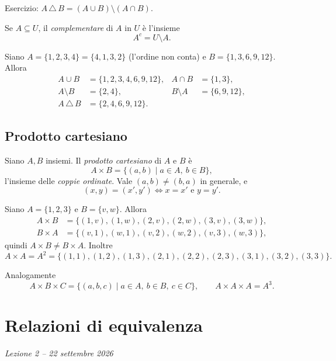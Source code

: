 \documentclass[11pt,a4paper]{article}
\begin{document}
Esercizio: $A \,\triangle\, B = (A \cup B) \setminus (A \cap B)$.

\begin{definizione}
Se $A \subseteq U$, il \emph{complementare} di $A$ in $U$ è l'insieme
\[
A^c = U \setminus A.
\]
\end{definizione}

\begin{esempio}
Siano $A = \{1, 2, 3, 4\} = \{4, 1, 3, 2\}$ (l'ordine non conta) e
$B = \{1, 3, 6, 9, 12\}$. Allora
\begin{align*}
A \cup B &= \{1, 2, 3, 4, 6, 9, 12\}, & A \cap B &= \{1, 3\}, \\
A \setminus B &= \{2, 4\}, & B \setminus A &= \{6, 9, 12\}, \\
A \,\triangle\, B &= \{2, 4, 6, 9, 12\}.
\end{align*}
\end{esempio}

\subsection{Prodotto cartesiano}

\begin{definizione}
Siano $A, B$ insiemi. Il \emph{prodotto cartesiano} di $A$ e $B$ è
\[
A \times B = \{(a, b) \mid a \in A,\ b \in B\},
\]
l'insieme delle \emph{coppie ordinate}. Vale $(a, b) \neq (b, a)$ in
generale, e
\[
(x, y) = (x', y') \iff x = x' \text{ e } y = y'.
\]
\end{definizione}

\begin{esempio}
Siano $A = \{1, 2, 3\}$ e $B = \{v, w\}$. Allora
\begin{align*}
A \times B &= \{(1,v), (1,w), (2,v), (2,w), (3,v), (3,w)\}, \\
B \times A &= \{(v,1), (w,1), (v,2), (w,2), (v,3), (w,3)\},
\end{align*}
quindi $A \times B \neq B \times A$. Inoltre
\[
A \times A = A^2 = \{(1,1), (1,2), (1,3), (2,1), (2,2), (2,3), (3,1),
(3,2), (3,3)\}.
\]
\end{esempio}

Analogamente
\[
A \times B \times C = \{(a, b, c) \mid a \in A,\ b \in B,\ c \in C\},
\qquad A \times A \times A = A^3.
\]

\section[Relazioni di equivalenza (Lezione 2 -- 22 settembre 2026)]{Relazioni di equivalenza}
\noindent\emph{Lezione 2 -- 22 settembre 2026}
\end{document}
